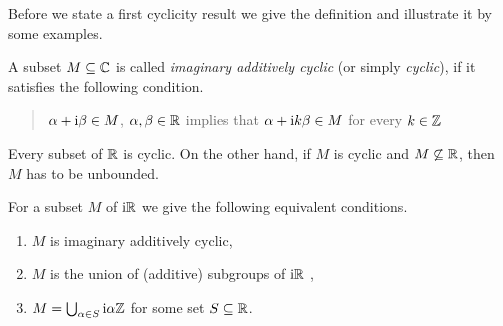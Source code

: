 Before we state a first cyclicity result we give the definition and illustrate it by some examples.
\begin{definition}\label{def:b3-2.5}

A subset $M \subseteq \mathbb{C}$ is called \emph{imaginary additively cyclic} 
(or simply \emph{cyclic}), if it satisfies the following condition. 
\begin{quote}
$\alpha + \mathrm{i}\beta \in M$, $\alpha,\beta \in \mathbb{R}$ implies that $\alpha +  \mathrm{i} k\beta \in M$ for every $k \in \mathbb{Z}$\,
\end{quote}
\end{definition}
Every subset of\/ $\mathbb{R}$ is cyclic. 
On the other hand, if\/ $M$ is cyclic and $M \not\subseteq \mathbb{R}$, then $M$ has to be unbounded.
	
For a subset $M$ of\/ $\mathrm{i} \mathbb{R}$ we give the following equivalent conditions.
	\begin{enumerate}[\upshape (a)]
		\item 
		$M$ is imaginary additively cyclic,
		
		\item 
		$M$ is the union of (additive) subgroups of\/ $\mathrm{i} \mathbb{R}$ , 
		
		\item 
		$M = \bigcup_{\alpha \in S} \mathrm{i}\alpha\mathbb{Z}$ for some set $S \subseteq \mathbb{R}$.
	\end{enumerate}
	
